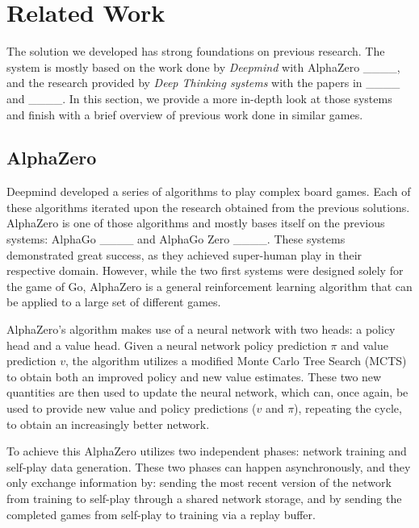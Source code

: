 \section{Related Work}

The solution we developed has strong foundations on previous research. The system is mostly based on the work done by \textit{Deepmind} with AlphaZero ____, and the research provided by \textit{Deep Thinking systems} with the papers in ____ and ____. In this section, we provide a more in-depth look at those systems and finish with a brief overview of previous work done in similar games.

\subsection{AlphaZero}

Deepmind developed a series of algorithms to play complex board games. Each of these algorithms iterated upon the research obtained from the previous solutions. AlphaZero is one of those algorithms and mostly bases itself on the previous systems: AlphaGo ____ and AlphaGo Zero ____. These systems demonstrated great success, as they achieved super-human play in their respective domain. However, while the two first systems were designed solely for the game of Go, AlphaZero is a general reinforcement learning algorithm that can be applied to a large set of different games.

AlphaZero's algorithm makes use of a neural network with two heads: a policy head and a value head. Given a neural network policy prediction $\pi$ and value prediction $v$, the algorithm utilizes a modified Monte Carlo Tree Search (MCTS) to obtain both an improved policy and new value estimates. These two new quantities are then used to update the neural network, which can, once again, be used to provide new value and policy predictions ($v$ and $\pi$), repeating the cycle, to obtain an increasingly better network.

To achieve this AlphaZero utilizes two independent phases: network training and self-play data generation. These two phases can happen asynchronously, and they only exchange information by: sending the most recent version of the network from training to self-play through a shared network storage, and by sending the completed games from self-play to training via a replay buffer.

